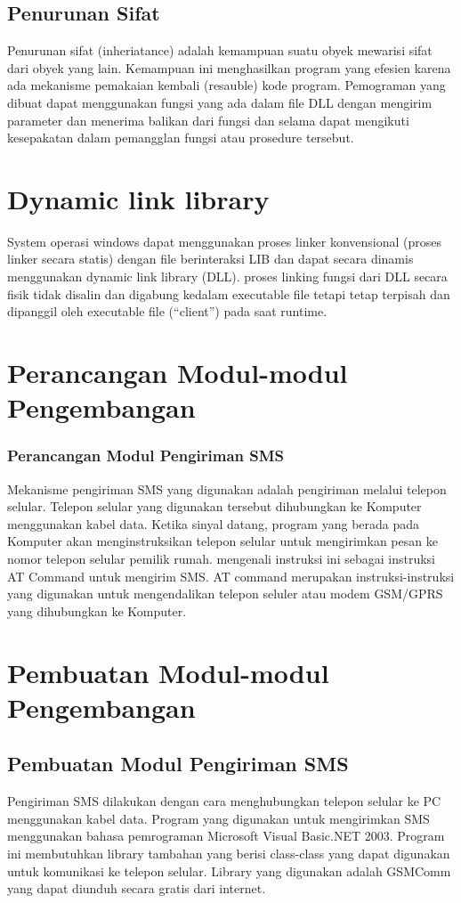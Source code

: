 \documentclass[12pt,a4paper]{article}
\begin{document}
\subsection{Penurunan Sifat}
Penurunan sifat (inheriatance) adalah kemampuan suatu obyek mewarisi sifat dari obyek yang lain. Kemampuan ini menghasilkan program yang efesien karena ada mekanisme pemakaian kembali (resauble) kode program. Pemograman yang dibuat dapat menggunakan fungsi yang ada dalam file DLL dengan mengirim parameter dan menerima balikan dari fungsi dan selama dapat mengikuti kesepakatan dalam pemangglan fungsi atau prosedure tersebut.


\section{Dynamic link library}
System operasi windows dapat menggunakan proses linker konvensional (proses linker secara statis) dengan file berinteraksi LIB dan dapat secara dinamis menggunakan dynamic link library (DLL).
proses linking fungsi dari DLL secara fisik tidak disalin dan digabung kedalam executable file tetapi tetap terpisah dan dipanggil oleh executable file (“client”) pada saat runtime.

\section{Perancangan Modul-modul Pengembangan}
\subsubsection{Perancangan Modul Pengiriman SMS}
Mekanisme pengiriman SMS yang digunakan adalah pengiriman melalui telepon selular. Telepon selular yang digunakan tersebut dihubungkan ke Komputer menggunakan kabel data. Ketika sinyal datang, program yang berada pada Komputer akan menginstruksikan telepon selular untuk mengirimkan pesan ke nomor telepon selular pemilik rumah.
mengenali instruksi ini sebagai instruksi AT Command untuk mengirim SMS. AT command merupakan instruksi-instruksi yang digunakan untuk mengendalikan telepon seluler atau modem GSM/GPRS yang dihubungkan ke Komputer.

\section{Pembuatan Modul-modul Pengembangan}

\subsection{Pembuatan Modul Pengiriman SMS}
Pengiriman SMS dilakukan dengan cara menghubungkan telepon selular ke PC menggunakan kabel data. 
Program yang digunakan untuk mengirimkan SMS menggunakan bahasa pemrograman Microsoft Visual Basic.NET 2003. Program ini membutuhkan library tambahan yang berisi class-class yang dapat digunakan untuk komunikasi ke telepon selular. Library yang digunakan adalah GSMComm yang dapat diunduh secara gratis dari internet. 
\end{document}
